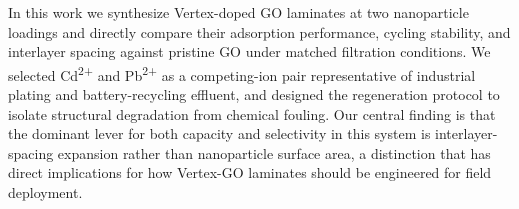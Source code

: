In this work we synthesize Vertex-doped GO laminates at two nanoparticle loadings and directly compare their adsorption performance, cycling stability, and interlayer spacing against pristine GO under matched filtration conditions. We selected Cd\textsuperscript{2+} and Pb\textsuperscript{2+} as a competing-ion pair representative of industrial plating and battery-recycling effluent, and designed the regeneration protocol to isolate structural degradation from chemical fouling. Our central finding is that the dominant lever for both capacity and selectivity in this system is interlayer-spacing expansion rather than nanoparticle surface area, a distinction that has direct implications for how Vertex-GO laminates should be engineered for field deployment.
